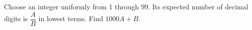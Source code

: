 Choose an integer uniformly from 1 through 99. Its expected number of decimal digits is $\dfrac{A}{B}$ in lowest terms. Find $1000A+B$.
